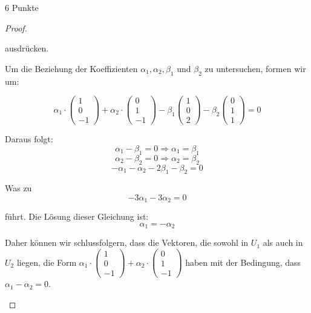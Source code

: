 \documentclass{problemset}
\begin{document}
\begin{problem}{6 Punkte}
\begin{proof}
\begin{enumerate}
		      ausdrücken.

		      Um die Beziehung der Koeffizienten \(\alpha_1, \alpha_2, \beta_1\) und \(\beta_2\) zu untersuchen, formen wir um:

		      \[
			      \alpha_1 \cdot \begin{pmatrix}
				      1 \\
				      0 \\
				      -1
			      \end{pmatrix} + \alpha_2 \cdot \begin{pmatrix}
				      0 \\
				      1 \\
				      -1
			      \end{pmatrix} - \beta_1 \begin{pmatrix}
				      1 \\ 0 \\ 2
			      \end{pmatrix} - \beta_2 \begin{pmatrix}
				      0 \\ 1 \\ 1
			      \end{pmatrix} = 0
		      \]

		      Daraus folgt:
		      \[
			      \alpha_1 - \beta_1 = 0 \Rightarrow \alpha_1 = \beta_1
		      \]
		      \[
			      \alpha_2 - \beta_2 = 0 \Rightarrow \alpha_2 = \beta_2
		      \]
		      \[
			      -\alpha_1 - \alpha_2 - 2\beta_1 - \beta_2 = 0
		      \]

		      Was zu
		      \[
			      -3\alpha_1 -3\alpha_2 = 0
		      \]

		      führt. Die Lösung dieser Gleichung ist:
		      \[
			      \alpha_1 = -\alpha_2
		      \]

		      Daher können wir schlussfolgern, dass die Vektoren, die sowohl in \(U_1\) als auch in \(U_2\) liegen, die Form \(\alpha_1 \cdot \begin{pmatrix}
			      1 \\
			      0 \\
			      -1
		      \end{pmatrix} + \alpha_2 \cdot \begin{pmatrix}
			      0 \\
			      1 \\
			      -1
		      \end{pmatrix}\) haben mit der Bedingung, dass \(\alpha_1 - \alpha_2 = 0\).
	\end{enumerate}
\end{proof}
\end{problem}
\end{document}
